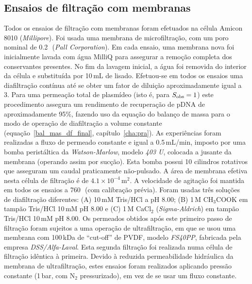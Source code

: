 \subsection{Ensaios de filtração com membranas}
\label{subsec:2p2art3}
Todos os ensaios de filtração com membranas foram efetuados na célula Amicon 8010 (\emph{Millipore}).
%
Foi usada uma membrana de microfiltração, com um poro nominal de 0.2\,\micro\meter\ (\emph{Pall Corporation}). Em cada ensaio, uma membrana nova foi inicialmente lavada com água MilliQ para assegurar a remoção completa dos conservantes presentes.
%
No fim da lavagem inicial, a água foi removida do interior da célula e substituída por 10\,mL de lisado. Efetuou-se em todos os ensaios uma diafiltração contínua até se obter um fator de diluição aproximadamente igual a 3.
%
Para uma permeação total de plasmídeo (isto é, para $S_{\mathrm{obs}}=1$) este procedimento assegura um rendimento de recuperação de pDNA de aproximadamente 95\%, fazendo uso da equação do balanço de massa para o modo de operação de diafiltração a volume constante (equação~\ref{bal_mas_df_final}, capítulo~\ref{cha:pra}).
%
As experiências foram realizadas a fluxo de permeado constante e igual a 0.5\,mL/min, imposto por uma bomba peristáltica da \emph{Watson-Marlow}, modelo \emph{403 U}, colocada a jusante da membrana (operando assim por sucção).
%
%
Esta bomba possui 10 cilindros rotativos que asseguram um caudal praticamente não-pulsado. A área de membrana efetiva nesta célula de filtração é de $4.1\times 10^{-4}\,\mathrm{m^{2}}$.
%
A velocidade de agitação foi mantida em todos os ensaios a 760\,\minmum\ (com calibração prévia).
%
Foram usadas três soluções de diafiltração diferentes: (A) 10\,mM Tris/HCl a pH 8.00; (B) 1\,M $\mathrm{CH_{3}COOK}$ em tampão Tris/HCl 10\,mM pH 8.00 e (C) 1\,M $\mathrm{CaCl_{2}}$ (\emph{Sigma-Aldrich}) em tampão Tris/HCl 10\,mM pH 8.00.
%
%
%
%
Os permeados obtidos após este primeiro passo de filtração foram sujeitos a uma operação de ultrafiltração, em que se usou uma membrana com 100\,kDa de ``cut-off'' de PVDF, modelo \emph{FS40PP}, fabricada pela empresa \emph{DSS/Alfa-Laval}.
%
%
%
Esta segunda filtração foi realizada numa célula de filtração idêntica à primeira. Devido à reduzida permeabilidade hidráulica da membrana de ultrafiltração, estes ensaios foram realizados aplicando pressão constante (1\,bar, com $\mathrm{N_{2}}$ pressurizado), em vez de se usar um fluxo constante.
%
%
%

